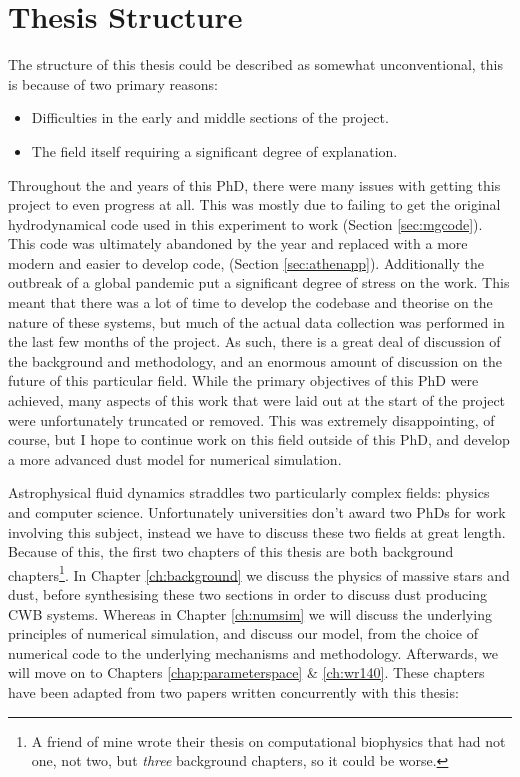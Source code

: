 \section{Thesis Structure}

The structure of this thesis could be described as somewhat unconventional, this is because of two primary reasons:

\begin{itemize}
  \item Difficulties in the early and middle sections of the project.
  \item The field itself requiring a significant degree of explanation.
\end{itemize}

\noindent
Throughout the  and  years of this PhD, there were many issues with getting this project to even progress at all.
This was mostly due to failing to get the original hydrodynamical code used in this experiment to work (Section \ref{sec:mgcode}).
This code was ultimately abandoned by the  year and replaced with a more modern and easier to develop code, \athena{} (Section \ref{sec:athenapp}).
Additionally the outbreak of a global pandemic put a significant degree of stress on the work.
This meant that there was a lot of time to develop the codebase and theorise on the nature of these systems, but much of the actual data collection was performed in the last few months of the project.
As such, there is a great deal of discussion of the background and methodology, and an enormous amount of discussion on the future of this particular field.
While the primary objectives of this PhD were achieved, many aspects of this work that were laid out at the start of the project were unfortunately truncated or removed.
This was extremely disappointing, of course, but I hope to continue work on this field outside of this PhD, and develop a more advanced dust model for numerical simulation.

Astrophysical fluid dynamics straddles two particularly complex fields: physics and computer science.
Unfortunately universities don't award two PhDs for work involving this subject, instead we have to discuss these two fields at great length.
Because of this, the first two chapters of this thesis are both background chapters\footnote{A friend of mine wrote their thesis on computational biophysics that had not one, not two, but \emph{three} background chapters, so it could be worse.}.
In Chapter \ref{ch:background} we discuss the physics of massive stars and dust, before synthesising these two sections in order to discuss dust producing CWB systems.
Whereas in Chapter \ref{ch:numsim} we will discuss the underlying principles of numerical simulation, and discuss our model, from the choice of numerical code to the underlying mechanisms and methodology.
Afterwards, we will move on to Chapters \ref{chap:parameterspace} \& \ref{ch:wr140}.
These chapters have been adapted from two papers written concurrently with this thesis:

